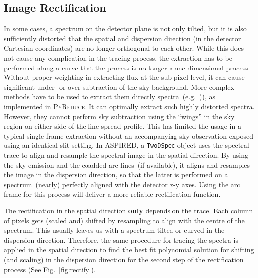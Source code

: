 \documentclass[twocolumn, linenumbers]{aastex631}
\begin{document}
\subsection{Image Rectification}
In some cases, a spectrum on the detector plane is not only tilted, but it is
also sufficiently distorted that the spatial and dispersion direction (in the
detector Cartesian coordinates) are no longer orthogonal to each other. While
this does not cause any complication in the tracing process, the extraction has
to be performed along a curve that the process is no longer a one dimensional
process. Without proper weighting in extracting flux at the sub-pixel level,
it can cause significant under- or over-subtraction of the sky background. More
complex methods have to be used to extract them directly
spectra~(e.g.\ \citet{2021A&A...646A..32P})), as implemented
in \textsc{PyReduce}. It can optimally extract such highly distorted spectra.
However, they cannot perform sky subtraction using the ``wings'' in the sky
region on either side of the line-spread profile. This has limited the usage
in a typical single-frame extraction without an accompanying sky observation
exposed using an identical slit setting. In \textsc{ASPIRED}, a
\texttt{TwoDSpec} object uses the spectral trace to align and resample the
spectral image in the spatial direction. By using the sky emission and the
coadded arc lines~(if available), it aligns and resamples the image in the
dispersion direction, so that the latter is performed on a spectrum~(nearly)
perfectly aligned with the detector x-y axes. Using the arc frame for this
process will deliver a more reliable rectification function.

The rectification in the spatial direction \textbf{only} depends on the trace.
Each column of pixels gets (scaled and) shifted by resampling to align with the
centre of the spectrum. This usually leaves us with a spectrum tilted or curved
in the dispersion direction. Therefore, the same procedure for tracing the
spectra is applied in the spatial direction to find the best fit polynomial
solution for shifting (and scaling) in the dispersion direction for the second
step of the rectification process (See Fig.~\ref{fig:rectify}).
\end{document}
